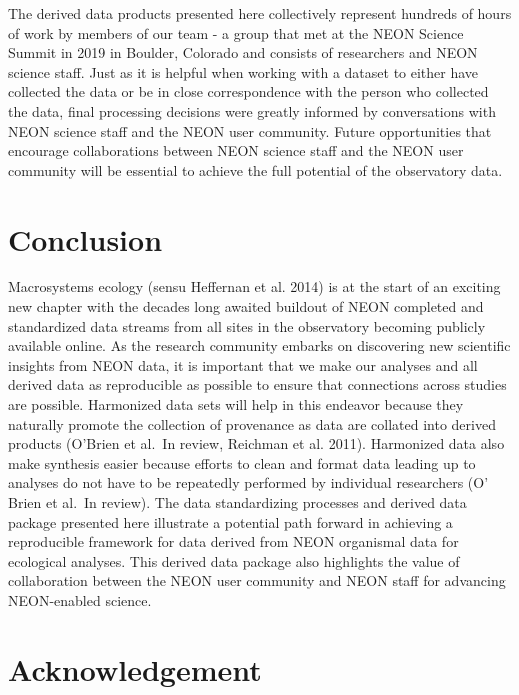 \documentclass[
  12pt,
]{article}
\begin{document}
The derived data products presented here collectively represent hundreds of hours of work by members of our team - a group that met at the NEON Science Summit in 2019 in Boulder, Colorado and consists of researchers and NEON science staff. Just as it is helpful when working with a dataset to either have collected the data or be in close correspondence with the person who collected the data, final processing decisions were greatly informed by conversations with NEON science staff and the NEON user community. Future opportunities that encourage collaborations between NEON science staff and the NEON user community will be essential to achieve the full potential of the observatory data.

\hypertarget{conclusion}{%
\section{Conclusion}\label{conclusion}}

Macrosystems ecology (sensu Heffernan et al. 2014) is at the start of an exciting new chapter with the decades long awaited buildout of NEON completed and standardized data streams from all sites in the observatory becoming publicly available online. As the research community embarks on discovering new scientific insights from NEON data, it is important that we make our analyses and all derived data as reproducible as possible to ensure that connections across studies are possible. Harmonized data sets will help in this endeavor because they naturally promote the collection of provenance as data are collated into derived products (O'Brien et al.~In review, Reichman et al. 2011). Harmonized data also make synthesis easier because efforts to clean and format data leading up to analyses do not have to be repeatedly performed by individual researchers (O' Brien et al.~In review). The data standardizing processes and derived data package presented here illustrate a potential path forward in achieving a reproducible framework for data derived from NEON organismal data for ecological analyses. This derived data package also highlights the value of collaboration between the NEON user community and NEON staff for advancing NEON-enabled science.

\hypertarget{acknowledgement}{%
\section{Acknowledgement}\label{acknowledgement}}
\end{document}
